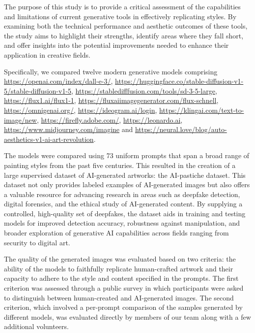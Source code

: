 \documentclass[sn-mathphys]{sn-jnl}
\begin{document}
The purpose of this study is to provide a critical assessment of the capabilities and limitations of current generative tools in effectively replicating styles. By examining both the technical performance and aesthetic outcomes of these tools, the study aims to highlight their strengths, identify areas where they fall short, and offer insights into the potential improvements needed to enhance their application in creative fields. 

Specifically, we compared twelve modern generative models comprising \href{DallE 3}{https://openai.com/index/dall-e-3/}, \href{Stable Diffusion 1.5}{https://huggingface.co/stable-diffusion-v1-5/stable-diffusion-v1-5}, \href{Stable Diffusion 3.5 large}{https://stabledifffusion.com/tools/sd-3-5-large}, \href{Flux 1.1 Pro}{https://flux1.ai/flux1-1}, \href{Flux 1 Schnell}{https://fluxaiimagegenerator.com/flux-schnell}, \href{Omnigen}{https://omnigenai.org/}, \href{Ideogram}{https://ideogram.ai/login}, \href{Kolors 1.5}{https://klingai.com/text-to-image/new}, \href{Firefly Image 3}{https://firefly.adobe.com/}, \href{Leonardo Pheonix}{https://leonardo.ai}, \href{Midjourney V6.1}{https://www.midjourney.com/imagine} and \href{Auto-Aesthetics v1}{https://neural.love/blog/auto-aesthetics-v1-ai-art-revolution}. 

The models were compared using 73 uniform prompts that span a broad range of painting styles from the past five centuries. This resulted in the creation of a
large supervised dataset of AI-generated artworks: the
AI-pastiche dataset. This dataset not only provides labeled examples of AI-generated images but also offers a valuable resource for advancing research in areas such as deepfake detection, digital forensics, and the ethical study of AI-generated content. By supplying a controlled, high-quality set of deepfakes, the dataset aids in training and testing models for improved detection accuracy, robustness against manipulation, and broader exploration of generative AI capabilities across fields ranging from security to digital art.

The quality of the generated images was evaluated based on two criteria: the ability of the models to faithfully replicate human-crafted artwork and their capacity to adhere to the style and content specified in the prompts. The first criterion was assessed through a public survey in which participants were asked to distinguish between human-created and AI-generated images. The second criterion, which involved a per-prompt comparison of the samples generated by different models, was evaluated directly by members of our team along with a few additional volunteers.
\end{document}
